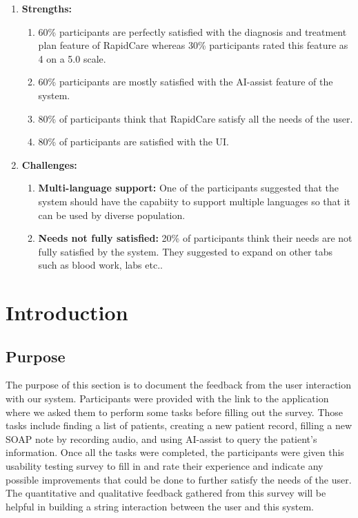 \documentclass{article}
\begin{document}
\begin{enumerate}
    \item \textbf{Strengths:}
    \begin{enumerate}
        \item 60\% participants are perfectly satisfied with the diagnosis and treatment plan feature of RapidCare whereas 30\% participants rated this feature as 4 on a 5.0 scale.
        \item 60\% participants are mostly satisfied with the AI-assist feature of the system.
        \item 80\% of participants think that RapidCare satisfy all the needs of the user.
        \item 80\% of participants are satisfied with the UI.
    \end{enumerate}
    \item \textbf{Challenges:}
    \begin{enumerate}
        \item \textbf{Multi-language support:} One of the participants suggested that the system should have the capabiity to support multiple languages so that it can be used by diverse population. 
        \item \textbf{Needs not fully satisfied:} 20\% of participants think their needs are not fully satisfied by the system. They suggested to expand on other tabs such as blood work, labs etc..
    \end{enumerate}
\end{enumerate}

\newpage

\section{Introduction}

\subsection{Purpose}

The purpose of this section is to document the feedback from the user interaction with our system. Participants were provided with the link to the application where we asked them to perform some tasks before filling out the survey. Those tasks include finding a list of patients, creating a new patient record, filling a new SOAP note by recording audio, and using AI-assist to query the patient's information. Once all the tasks were completed, the participants were given this usability testing survey to fill in and rate their experience and indicate any possible improvements that could be done to further satisfy the needs of the user. The quantitative and qualitative feedback gathered from this survey will be helpful in building a string interaction between the user and this system. 
\end{document}
